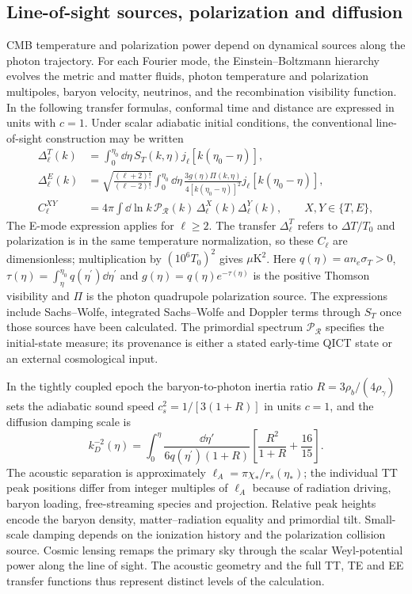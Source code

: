 \subsection{Line-of-sight sources, polarization and diffusion}
\label{sec:cmb-hierarchy}
CMB temperature and polarization power depend on dynamical sources along the photon trajectory. For each Fourier mode, the Einstein--Boltzmann hierarchy evolves the metric and matter fluids, photon temperature and polarization multipoles, baryon velocity, neutrinos, and the recombination visibility function. In the following transfer formulas, conformal time and distance are expressed in units with $c=1$. Under scalar adiabatic initial conditions, the conventional line-of-sight construction may be written \cite{Ma95,Seljak96}
\begin{align}
\Delta_\ell^{T}(k)&=\int_0^{\eta_0}\dd\eta\,S_T(k,\eta)j_\ell[k(\eta_0-\eta)],\\
\Delta_\ell^{E}(k)&=\sqrt{\frac{(\ell+2)!}{(\ell-2)!}}
\int_0^{\eta_0}\dd\eta\,\frac{3g(\eta)\Pi(k,\eta)}{4[k(\eta_0-\eta)]^2}
 j_\ell[k(\eta_0-\eta)],\\
C_\ell^{XY}&=4\pi\int\dd\ln k\,\mathcal P_{\mathcal R}(k)\,\Delta_\ell^{X}(k)\Delta_\ell^{Y}(k),
\qquad X,Y\in\{T,E\},
\label{eq:cl}
\end{align}
The E-mode expression applies for $\ell\geq2$. The transfer $\Delta_\ell^T$ refers to $\Delta T/T_0$ and polarization is in the same temperature normalization, so these $C_\ell$ are dimensionless; multiplication by $(10^6T_0)^2$ gives $\mu\mathrm K^2$. Here $q(\eta)=a n_e\sigma_T>0$, $\tau(\eta)=\int_\eta^{\eta_0}q(\eta^{\prime})\dd\eta^{\prime}$ and $g(\eta)=q(\eta)e^{-\tau(\eta)}$ is the positive Thomson visibility and $\Pi$ is the photon quadrupole polarization source. The expressions include Sachs--Wolfe, integrated Sachs--Wolfe and Doppler terms through $S_T$ once those sources have been calculated. The primordial spectrum $\mathcal P_{\mathcal R}$ specifies the initial-state measure; its provenance is either a stated early-time QICT state or an external cosmological input.

In the tightly coupled epoch the baryon-to-photon inertia ratio $R=3\rho_b/(4\rho_\gamma)$ sets the adiabatic sound speed $c_s^2=1/[3(1+R)]$ in units $c=1$, and the diffusion damping scale is
\begin{equation}
 k_D^{-2}(\eta)=\int_0^\eta\frac{\dd\eta'}{6q(\eta^{\prime})(1+R)}
\left[\frac{R^2}{1+R}+\frac{16}{15}\right].
\label{eq:silk}
\end{equation}
The acoustic separation is approximately $\ell_A=\pi\chi_*/r_s(\eta_*)$; the individual TT peak positions differ from integer multiples of $\ell_A$ because of radiation driving, baryon loading, free-streaming species and projection. Relative peak heights encode the baryon density, matter--radiation equality and primordial tilt. Small-scale damping depends on the ionization history and the polarization collision source. Cosmic lensing remaps the primary sky through the scalar Weyl-potential power along the line of sight. The acoustic geometry and the full TT, TE and EE transfer functions thus represent distinct levels of the calculation.

